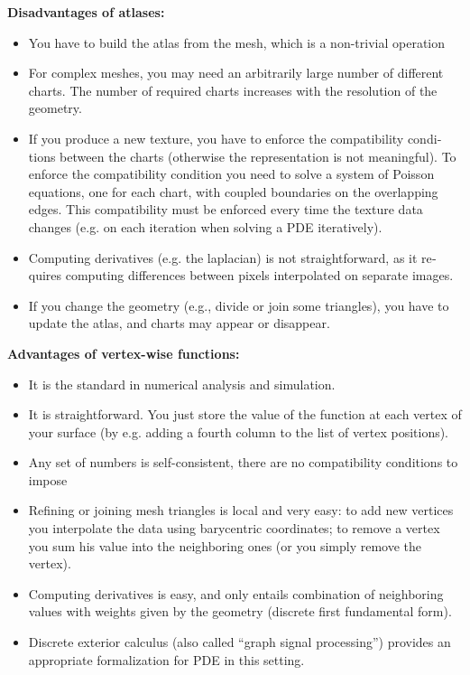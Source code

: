 \documentclass{article}
\begin{document}
\begin{otherlanguage}{british}
{\bf Disadvantages of atlases:}

\begin{itemize}
	\item You have to build the atlas from the mesh, which is a non-trivial
		operation
	\item For complex meshes, you may need an arbitrarily large number
		of different charts.  The number of required charts increases
		with the resolution of the geometry.
	\item If you produce a new texture, you have to enforce the
		compatibility conditions between the charts (otherwise the
		representation is not meaningful).  To enforce the
		compatibility condition you need to solve
		a system of Poisson equations, one for each chart, with
		coupled boundaries on the overlapping edges.  This
		compatibility must be enforced every time the texture data
		changes (e.g. on each iteration when solving a PDE
		iteratively).
	\item Computing derivatives (e.g. the laplacian) is not
		straightforward, as it requires computing differences
		between pixels interpolated on separate images.
	\item If you change the geometry (e.g., divide or join some
		triangles), you have to update the atlas, and charts may
		appear or disappear.
\end{itemize}

{\bf Advantages of vertex-wise functions:}

\begin{itemize}
	\item It is the standard in numerical analysis and simulation.
	\item It is straightforward. You just store the value of the function
		at each vertex of your surface (by e.g. adding a fourth
		column to the list of vertex positions).
	\item Any set of numbers is self-consistent, there are no
		compatibility conditions to impose
	\item Refining or joining mesh triangles is local and very easy: to add
		new vertices you interpolate the data using barycentric
		coordinates; to remove a vertex you sum his value into the
		neighboring ones (or you simply remove the vertex).
	\item Computing derivatives is easy, and only entails combination of
		neighboring values with weights given by the geometry
		(discrete first fundamental form).
	\item Discrete exterior calculus (also called ``graph signal
		processing'') provides an appropriate
		formalization for PDE in this setting.
\end{itemize}


\end{otherlanguage}
\end{document}
